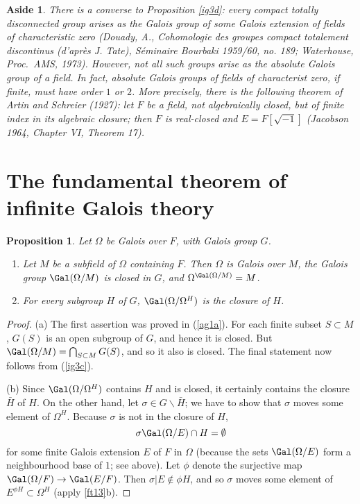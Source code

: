 \documentclass[a4paper,11pt,final,openany]{memoir}
\newtheorem{proposition}[X]{Proposition}
\newtheorem{aside}[X]{Aside}
\theoremstyle{nonumberplain}
\newtheorem{proof}{Proof.}
\begin{document}
\begin{aside}
\label{ig4}There is a converse to Proposition \ref{ig3d}: every compact
totally disconnected group arises as the Galois group of some Galois extension
of fields of characteristic zero (Douady, A., Cohomologie des groupes compact
totalement discontinus (d'apr\`{e}s J. Tate), S\'{e}minaire Bourbaki 1959/60,
no. 189; Waterhouse, Proc.\ AMS, 1973). However, not all such groups arise as
the \textit{absolute} Galois group of a field. In fact, absolute Galois groups
of fields of characterist zero, if finite, must have order $1$ or $2$. More
precisely, there is the following theorem of Artin and Schreier (1927): let
$F$ be a field, not algebraically closed, but of finite index in its algebraic
closure; then $F$ is real-closed and $E=F[\sqrt{-1}]$ (Jacobson 1964, Chapter
VI, Theorem 17).
\end{aside}

\section{The fundamental theorem of infinite Galois theory}

\begin{proposition}
\label{ig5}Let $\Omega$ be Galois over $F$, with Galois group $G$.

\begin{enumerate}
\item Let $M$ be a subfield of $\Omega$ containing $F$. Then $\Omega$ is
Galois over $M$, the Galois group $\Gal(\Omega/M)$ is closed in $G$, and
$\Omega^{\Gal(\Omega/M)}=M$.

\item For every subgroup $H$ of $G$, $\Gal(\Omega/\Omega^{H})$ is the closure
of $H$.
\end{enumerate}
\end{proposition}

\begin{proof}
(a) The first assertion was proved in (\ref{ag1a}). For each finite subset
$S\subset M$, $G(S)$ is an open subgroup of $G$, and hence it is closed. But
$\Gal(\Omega/M)=\bigcap_{S\subset M}G(S)$, and so it also is closed. The final
statement now follows from (\ref{ig3c}).

(b) Since $\Gal(\Omega/\Omega^{H})$ contains $H$ and is closed, it certainly
contains the closure $\bar{H}$ of $H$. On the other hand, let $\sigma\in
G\smallsetminus\bar{H}$; we have to show that $\sigma$ moves some element of
$\Omega^{H}$. Because $\sigma$ is not in the closure of $H$,
\[
\sigma\Gal(\Omega/E)\cap H=\emptyset
\]
for some finite Galois extension $E$ of $F$ in $\Omega$ (because the sets
$\Gal(\Omega/E)$ form a neighbourhood base of $1$; see above). Let $\phi$
denote the surjective map $\Gal(\Omega/F)\rightarrow\Gal(E/F)$. Then
$\sigma|E\notin\phi H$, and so $\sigma$ moves some element of $E^{\phi
H}\subset\Omega^{H}$ (apply \ref{ft13}b).
\end{proof}
\end{document}

